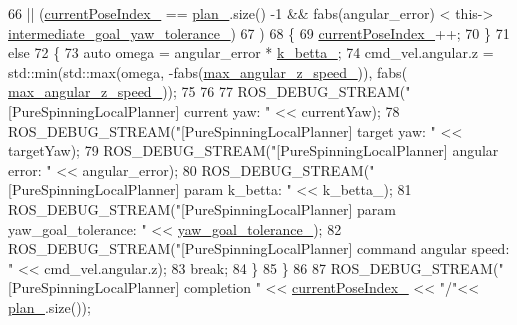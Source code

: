 \begin{DoxyCode}
66          || (\hyperlink{classcl__move__base__z_1_1pure__spinning__local__planner_1_1PureSpinningLocalPlanner_aa0f9b4cf52a76e44dc2cfc5103d52dcd}{currentPoseIndex\_} == \hyperlink{classcl__move__base__z_1_1pure__spinning__local__planner_1_1PureSpinningLocalPlanner_a31875ee78bae4698b579e20c0754860d}{plan\_}.size() -1 && fabs(angular\_error) < this->
      \hyperlink{classcl__move__base__z_1_1pure__spinning__local__planner_1_1PureSpinningLocalPlanner_a2e8dfda5e9dea6f09db4056aa90b2aa8}{intermediate\_goal\_yaw\_tolerance\_})
67     )
68     \{
69       \hyperlink{classcl__move__base__z_1_1pure__spinning__local__planner_1_1PureSpinningLocalPlanner_aa0f9b4cf52a76e44dc2cfc5103d52dcd}{currentPoseIndex\_}++;
70     \}
71     \textcolor{keywordflow}{else}
72     \{
73       \textcolor{keyword}{auto} omega = angular\_error * \hyperlink{classcl__move__base__z_1_1pure__spinning__local__planner_1_1PureSpinningLocalPlanner_a379d2ba057231d76edd1a661d3572d68}{k\_betta\_};
74       cmd\_vel.angular.z = std::min(std::max(omega, -fabs(\hyperlink{classcl__move__base__z_1_1pure__spinning__local__planner_1_1PureSpinningLocalPlanner_a20edb2db356925684de4ee4fe03d5992}{max\_angular\_z\_speed\_})), fabs(
      \hyperlink{classcl__move__base__z_1_1pure__spinning__local__planner_1_1PureSpinningLocalPlanner_a20edb2db356925684de4ee4fe03d5992}{max\_angular\_z\_speed\_}));
75 
76 
77       ROS\_DEBUG\_STREAM(\textcolor{stringliteral}{"[PureSpinningLocalPlanner] current yaw: "} << currentYaw);
78       ROS\_DEBUG\_STREAM(\textcolor{stringliteral}{"[PureSpinningLocalPlanner] target yaw: "} << targetYaw);
79       ROS\_DEBUG\_STREAM(\textcolor{stringliteral}{"[PureSpinningLocalPlanner] angular error: "} << angular\_error);
80       ROS\_DEBUG\_STREAM(\textcolor{stringliteral}{"[PureSpinningLocalPlanner] param k\_betta: "} << k\_betta\_);
81       ROS\_DEBUG\_STREAM(\textcolor{stringliteral}{"[PureSpinningLocalPlanner] param yaw\_goal\_tolerance: "} << 
      \hyperlink{classcl__move__base__z_1_1pure__spinning__local__planner_1_1PureSpinningLocalPlanner_a07334cd7bf29f391c2553f0038fa94e8}{yaw\_goal\_tolerance\_});
82       ROS\_DEBUG\_STREAM(\textcolor{stringliteral}{"[PureSpinningLocalPlanner] command angular speed: "} << cmd\_vel.angular.z);
83       \textcolor{keywordflow}{break};
84     \}
85   \}
86 
87   ROS\_DEBUG\_STREAM(\textcolor{stringliteral}{"[PureSpinningLocalPlanner] completion "} << \hyperlink{classcl__move__base__z_1_1pure__spinning__local__planner_1_1PureSpinningLocalPlanner_aa0f9b4cf52a76e44dc2cfc5103d52dcd}{currentPoseIndex\_} << \textcolor{stringliteral}{"/"}<< 
      \hyperlink{classcl__move__base__z_1_1pure__spinning__local__planner_1_1PureSpinningLocalPlanner_a31875ee78bae4698b579e20c0754860d}{plan\_}.size());

\end{DoxyCode}
